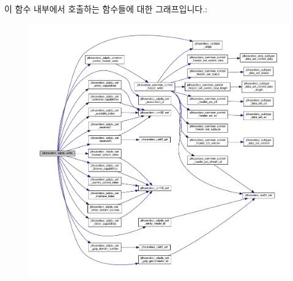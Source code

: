 이 함수 내부에서 호출하는 함수들에 대한 그래프입니다.\+:
\nopagebreak
\begin{figure}[H]
\begin{center}
\leavevmode
\includegraphics[width=350pt]{group__adpdu_ga7bd0ab3bb99e42c12c7472678a4a00ca_cgraph}
\end{center}
\end{figure}


